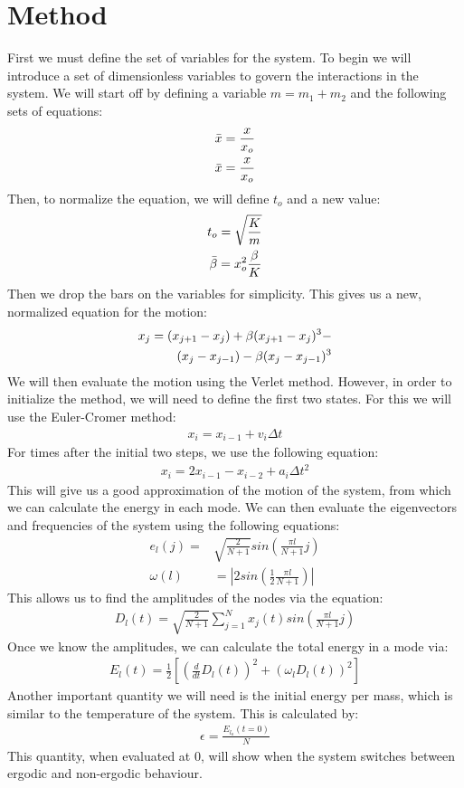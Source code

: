 \documentclass[pra,twocolumn,showpacs,amsmath,amssymb]{revtex4-2}
\begin{document}
\section{Method} \label{sec:method}

First we must define the set of variables for the system. To begin we will introduce a set of dimensionless variables to govern the interactions in the system. We will start off by defining a variable \(m = m_1 + m_2\) and the following sets of equations:
\begin{align}
\bar{x} &= \frac{x}{x_o} \notag \\
\bar{x} &= \frac{x}{x_o} \notag
\end{align}
Then, to normalize the equation, we will define $t_o$ and a new value:
\begin{align}
    t_o = \sqrt{\frac{K}{m}} \notag \\
    \bar{\beta} = x_o^2 \frac{\beta}{K}
\end{align}
Then we drop the bars on the variables for simplicity. This gives us a new, normalized equation for the motion:
\begin{align}
x_j = (x_{j+1} - x_j) + \beta(x_{j+1} - x_j)^3 - \\
(x_{j} - x_{j - 1}) - \beta(x_{j} - x_{j - 1})^3 \notag
\end{align}
We will then evaluate the motion using the Verlet method. However, in order to initialize the method, we will need to define the first two states. For this we will use the Euler-Cromer method:
\begin{align}
x_i = x_{i-1} + v_i \Delta t
\end{align}
For times after the initial two steps, we use the following equation:
\begin{align}
    x_i = 2x_{i-1} - x_{i-2} + a_i \Delta t ^2
\end{align}
This will give us a good approximation of the motion of the system, from which we can calculate the energy in each mode. We can then evaluate the eigenvectors and frequencies of the system using the following equations:
\begin{align}
    e_l(j) = &\sqrt{\frac{2}{N+1}}sin(\frac{\pi l}{N+1}j) \\
    \omega(l) & = | 2sin(\frac{1}{2} \frac{\pi l}{N+1})|
\end{align}
This allows us to find the amplitudes of the nodes via the equation:
\begin{align}
    D_l(t) = \sqrt{\frac{2}{N+1}} \sum_{j=1}^N x_j(t)sin(\frac{\pi l}{N+1}j)
\end{align}
Once we know the amplitudes, we can calculate the total energy in a mode via:
\begin{align}
    E_l(t) = \frac{1}{2}[(\frac{d}{dt} D_l(t))^2 + (\omega_l D_l(t))^2]
\end{align}
Another important quantity we will need is the initial energy per mass, which is similar to the temperature of the system. This is calculated by:
\begin{align}
    \epsilon = \frac{E_l_o(t=0)}{N}
\end{align}
This quantity, when evaluated at 0, will show when the system switches between ergodic and non-ergodic behaviour.
\end{document}

